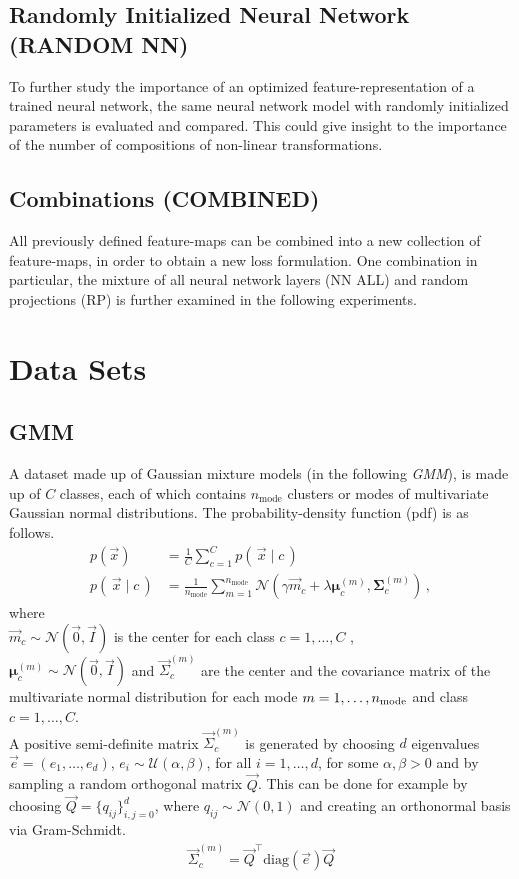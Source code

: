 \subsection{Randomly Initialized Neural Network (RANDOM NN)}
To further study the importance of an optimized feature-representation of a trained neural network, 
the same neural network model with randomly initialized parameters is evaluated and compared.
This could give insight to the importance of the number of compositions of non-linear transformations.

\subsection{Combinations (COMBINED)}
All previously defined feature-maps can be combined into a new collection of feature-maps,
in order to obtain a new loss formulation.
One combination in particular, the mixture of all neural network layers (NN ALL) and random projections (RP) is further examined in the following experiments.


\section{Data Sets}
\label{sec:datasets}

\subsection{GMM}
\label{sec:datasetgmm}
A dataset made up of Gaussian mixture models (in the following \textit{GMM}), 
is made up of $C$ classes, each of which contains $n_\text{mode}$ clusters or modes of multivariate Gaussian normal distributions. The probability-density function (pdf) is as follows.
\begin{align}
\label{eqn:gmm_distr}
    p(\vec x) &= \frac 1 C \sum_{c=1}^C p(\, \vec x \mid c \,) \nonumber\\
    p(\, \vec x \mid c \,) &= \frac 1 {n_\text{mode}} \sum _{m=1}^{n_\text{mode}}
    \mathcal N (\gamma \vec m_c + \lambda \boldsymbol \mu_c^{(m)}, \boldsymbol \Sigma_c^{(m)}) \, ,
\end{align}
where \\
$\vec m_c \sim \mathcal N (\vec 0, \vec I)$ is the center for each class $c=1,\ldots, C$ ,\\
$\boldsymbol \mu_c^{(m)} \sim \mathcal N (\vec 0, \vec I)$ and
$\vec \Sigma_c^{(m)}$ are the center and the covariance matrix of the multivariate normal distribution
for each mode $m=1,\ldots, n_{\textnormal{mode}}$ and class $c=1,\ldots, C$.  \\
A positive semi-definite matrix $\vec \Sigma_c^{(m)}$ is generated by choosing $d$ eigenvalues $\vec e = (e_1, \ldots, e_d)$, $e_i \sim \mathcal U(\alpha, \beta)$, for all $i=1, \ldots, d$, for some $\alpha, \beta > 0$ and 
by sampling a random orthogonal matrix $\vec Q$. 
This can be done for example by choosing $\vec Q = \{q_{ij}\}_{i,j=0}^{d}$, 
where $q_{ij} \sim \mathcal N(0, 1)$
and creating an orthonormal basis via Gram-Schmidt. 
\begin{align*}
    \vec \Sigma_c^{(m)} = \vec Q^\top \text{diag}(\vec e) \vec Q
\end{align*}

